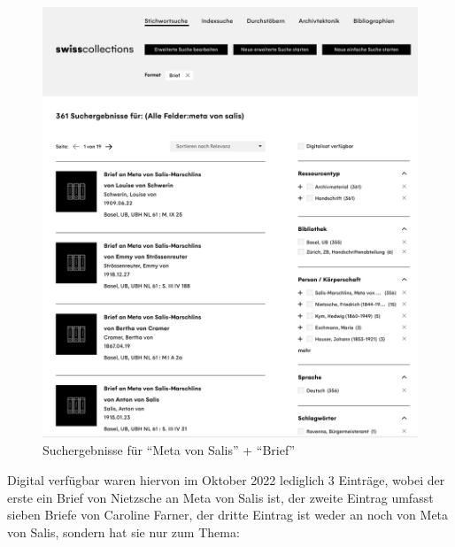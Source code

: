 \documentclass[
  letterpaper,
]{book}
\begin{document}
\begin{figure}
\begin{minipage}[t]{0.49\linewidth}
{{\includegraphics{./_book/images/suchergebnisse_1.png}

}

\caption{Suchergebnisse für ``Meta von Salis'' + ``Brief''}

}

\end{minipage}%

\end{figure}

Digital verfügbar waren hiervon im Oktober 2022 lediglich 3 Einträge,
wobei der erste ein Brief von Nietzsche an Meta von Salis ist, der
zweite Eintrag umfasst sieben Briefe von Caroline Farner, der dritte
Eintrag ist weder an noch von Meta von Salis, sondern hat sie nur zum
Thema:
\end{document}
